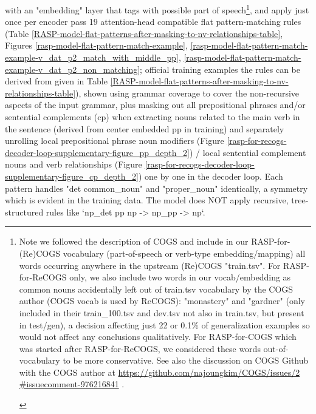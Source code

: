 \documentclass[11pt]{article}
\begin{document}
with an "embedding" layer that tags with possible part of speech\footnote{\begin{footnotesize}Note we followed the \cite{klinger2024compositionalprogramgenerationfewshot} description of COGS and include in our RASP-for-(Re)COGS vocabulary (part-of-speech or verb-type embedding/mapping) all words occurring anywhere in the upstream (Re)COGS "train.tsv". For RASP-for-ReCOGS only, we also include two words in our vocab/embedding as common nouns accidentally left out of train.tsv vocabulary by the COGS author (COGS vocab is used by ReCOGS): "monastery" and "gardner" (only included in their train\_100.tsv and dev.tsv not also in train.tsv, but present in test/gen), a decision affecting just 22 or 0.1\% of generalization examples so would not affect any conclusions qualitatively. For RASP-for-COGS which was started after RASP-for-ReCOGS, we considered these words out-of-vocabulary to be more conservative. See also the discussion on COGS Github with the COGS author at \href{https://github.com/najoungkim/COGS/issues/2\#issuecomment-976216841}{https://github.com/najoungkim/COGS/issues/2
\#issuecomment-976216841} .\end{footnotesize}}, and apply just once per encoder pass 19 attention-head compatible flat pattern-matching rules (Table \ref{RASP-model-flat-patterns-after-masking-to-nv-relationships-table}, Figures \ref{rasp-model-flat-pattern-match-example}, \ref{rasp-model-flat-pattern-match-example-v_dat_p2_match_with_middle_pp}, \ref{rasp-model-flat-pattern-match-example-v_dat_p2_non_matching}; official training examples the rules can be derived from given in Table \ref{RASP-model-flat-patterns-after-masking-to-nv-relationships-table}), shown using grammar coverage \cite{fuzzingbook2023:GrammarCoverageFuzzer} to cover the non-recursive aspects of the input grammar, plus masking out all prepositional phrases and/or sentential complements (cp) when extracting nouns related to the main verb in the sentence (derived from center embedded pp in training) and separately unrolling local prepositional phrase noun modifiers (Figure \ref{rasp-for-recogs-decoder-loop-supplementary-figure_pp_depth_2}) / local sentential complement nouns and verb relationships (Figure \ref{rasp-for-recogs-decoder-loop-supplementary-figure_cp_depth_2}) one by one in the decoder loop. Each pattern handles "det common\_noun" and "proper\_noun" identically, a symmetry which is evident in the training data. The model does NOT apply recursive, tree-structured rules like `np\_det pp np -> np\_pp -> np`.
\end{document}
